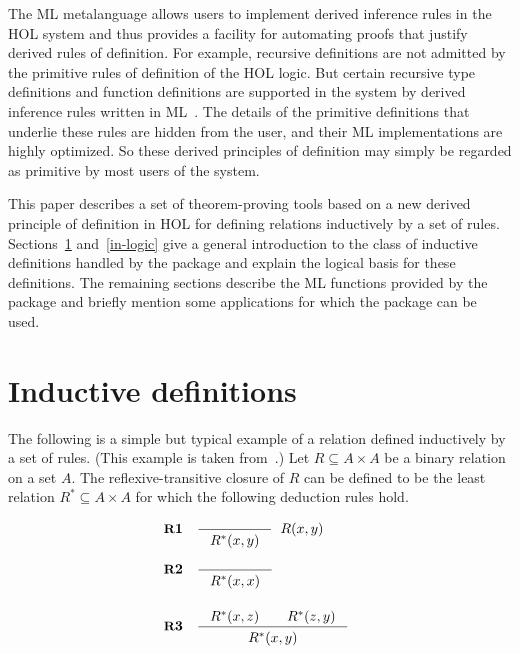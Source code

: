 \documentclass[twocolumn,fleqn,layout]{article}
\begin{document}
The {\small ML} metalanguage allows users to implement derived inference rules
in the {\small HOL} system and thus provides a facility for automating proofs
that justify derived rules of definition.  For example, recursive
\mbox{definitions} are not admitted by the primitive rules of definition of the
{\small HOL} logic.  But certain recursive type definitions and function
definitions are supported in the system by derived inference rules written in
{\small ML}~\cite{description,melham}.  The details of the primitive
definitions that underlie these rules are hidden from the user, and their
{\small ML} implementations are highly optimized. So these \mbox{derived}
principles of definition may simply be regarded as primitive by most users of
the system.

This paper describes a set of theorem-proving tools based on a new derived
principle of definition in {\small HOL} for defining relations inductively by a
set of rules. \mbox{Sections~\ref{ind-defs}} and~\ref{in-logic} give a general
introduction to the class of inductive definitions handled by the package and
explain the logical basis for these definitions.  The remaining sections
describe the {\small ML} functions provided by the package and briefly mention
some applications for which the package can be used.

\section{Inductive definitions}\label{ind-defs}

The following is a simple but typical example of a relation defined inductively
by a set of rules. (This example is taken from~\cite{pitts}.) Let $R \subseteq
A \times A$ be a binary relation on a set $A$.  The reflexive-transitive
closure of $R$ can be defined to be the least relation $R^{*} \subseteq A
\times A$ for which the following deduction rules hold.

\medskip

\[ \begin{array}[t]{@{}l}
   \hbox{{\small\bf R}\bf 1}\quad\Rule{}{R^{*}(x,y)}\;\; R(x,y) \\[6mm]
   \hbox{{\small\bf R}\bf 2}\quad\Rule{}{R^{*}(x,x)}\\[8mm]
   \hbox{{\small\bf R}\bf 3}\quad\Rule{R^{*}(x,z)\qquad R^{*}(z,y)}
         {R^{*}(x,y)}
\end{array} \]

\medskip
\end{document}
